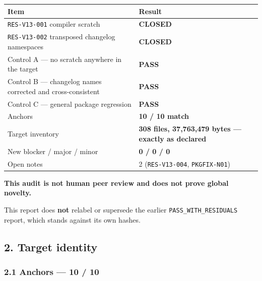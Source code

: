 \documentclass[
  9pt,
  a4paper,
]{article}
\newcounter{none} %
\begin{document}
{\def\LTcaptype{none} %
\begin{longtable}[]{@{}ll@{}}
\toprule\noalign{}
Item & Result \\
\midrule\noalign{}
\endhead
\bottomrule\noalign{}
\endlastfoot
\texttt{RES-V13-001} compiler scratch & \textbf{CLOSED} \\
\texttt{RES-V13-002} transposed changelog namespaces &
\textbf{CLOSED} \\
Control A --- no scratch anywhere in the target & \textbf{PASS} \\
Control B --- changelog names corrected and cross-consistent &
\textbf{PASS} \\
Control C --- general package regression & \textbf{PASS} \\
Anchors & \textbf{10 / 10 match} \\
Target inventory & \textbf{308 files, 37,763,479 bytes --- exactly as
declared} \\
New blocker / major / minor & \textbf{0 / 0 / 0} \\
Open notes & 2 (\texttt{RES-V13-004}, \texttt{PKGFIX-N01}) \\
\end{longtable}
}

\textbf{This audit is not human peer review and does not prove global
novelty.}

This report does \textbf{not} relabel or supersede the earlier
\texttt{PASS\_WITH\_RESIDUALS} report, which stands against its own
hashes.

\subsection{2. Target identity}\label{2-target-identity}

\subsubsection{2.1 Anchors --- 10 / 10}\label{21-anchors--10--10}
\end{document}
